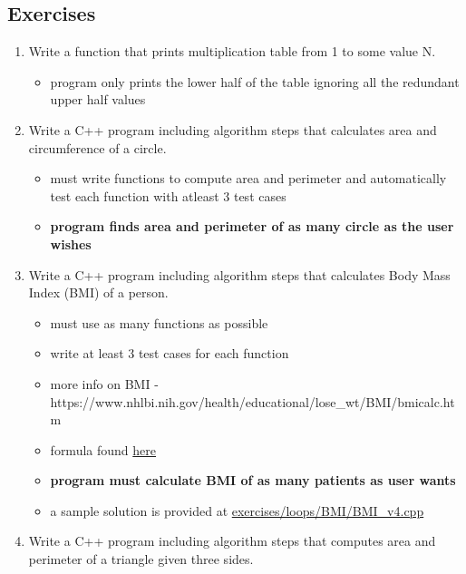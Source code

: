 \documentclass[11pt]{article}
\providecommand{\tightlist}{%
      \setlength{\itemsep}{0pt}\setlength{\parskip}{0pt}}
\begin{document}
    \hypertarget{exercises}{%
\subsection{Exercises}\label{exercises}}

\begin{enumerate}
\def\labelenumi{\arabic{enumi}.}
\item
  Write a function that prints multiplication table from 1 to some value
  N.

  \begin{itemize}
  \tightlist
  \item
    program only prints the lower half of the table ignoring all the
    redundant upper half values
  \end{itemize}
\item
  Write a C++ program including algorithm steps that calculates area and
  circumference of a circle.

  \begin{itemize}
  \tightlist
  \item
    must write functions to compute area and perimeter and automatically
    test each function with atleast 3 test cases
  \item
    \textbf{program finds area and perimeter of as many circle as the
    user wishes}
  \end{itemize}
\item
  Write a C++ program including algorithm steps that calculates Body
  Mass Index (BMI) of a person.

  \begin{itemize}
  \tightlist
  \item
    must use as many functions as possible
  \item
    write at least 3 test cases for each function
  \item
    more info on BMI -
    https://www.nhlbi.nih.gov/health/educational/lose\_wt/BMI/bmicalc.htm
  \item
    formula found
    \href{https://www.cdc.gov/healthyweight/assessing/bmi/childrens_bmi/childrens_bmi_formula.html\#:~:text=The\%20formula\%20for\%20BMI\%20is,to\%20convert\%20this\%20to\%20meters.\&text=When\%20using\%20English\%20measurements\%2C\%20pounds\%20should\%20be\%20divided\%20by\%20inches\%20squared}{here}
  \item
    \textbf{program must calculate BMI of as many patients as user
    wants}
  \item
    a sample solution is provided at
    \url{exercises/loops/BMI/BMI_v4.cpp}
  \end{itemize}
\item
  Write a C++ program including algorithm steps that computes area and
  perimeter of a triangle given three sides.


\end{enumerate}
\end{document}
